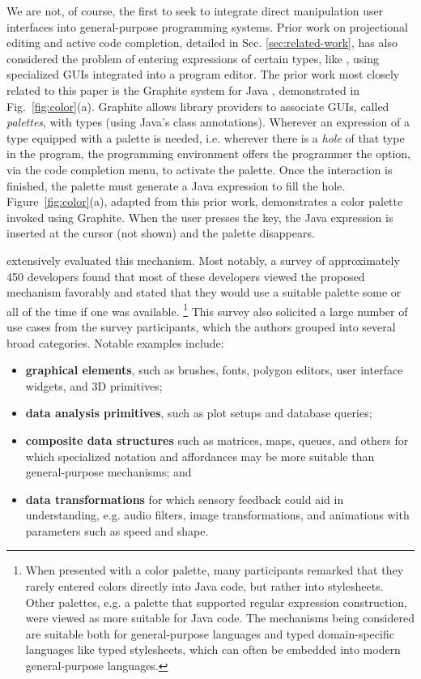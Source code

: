We are not, of course, the first to seek to integrate direct manipulation user interfaces
into general-purpose programming systems.
Prior work on projectional editing
and active code completion, detailed in Sec. \ref{sec:related-work},
has also considered the problem of entering expressions
of certain types, like ,
using specialized GUIs integrated into a program editor.
The prior work most closely related to this paper is the {Graphite} system for Java \cite{Graphite},
demonstrated in Fig.~\ref{fig:color}(a).
Graphite allows library providers to associate GUIs, called \emph{palettes}, with types (using Java's class annotations).
Wherever an expression of a type equipped with a palette is needed,
i.e. wherever there is a \emph{hole} of that type in the program,
the programming environment offers the programmer the option, via the code completion menu,
to activate the palette.
Once the interaction is finished, the palette must generate a
Java expression to fill the hole.
Figure~\ref{fig:color}(a), adapted from this prior work, demonstrates a color palette invoked using Graphite.
When the user presses the  key, the Java expression  is inserted at the cursor (not shown) and the palette disappears.

\citet{Graphite} extensively evaluated this mechanism.
Most notably, a survey of approximately 450 developers found that
most of these developers viewed the proposed mechanism favorably and stated that they
would use a suitable palette some or all of the time if one was available.%
\footnote{When presented with a color palette,
many participants remarked that they rarely entered colors directly into Java code,
but rather into stylesheets.
Other palettes, e.g. a palette
that supported regular expression construction, were viewed as more
suitable for Java code.
The mechanisms being considered are suitable both for general-purpose languages
and typed domain-specific languages like typed stylesheets, which can often be embedded into modern
general-purpose languages.}
This survey also solicited a large number of use cases from the survey participants,
which the authors grouped into several broad categories. Notable examples include:
\begin{itemize}
  \item \textbf{graphical elements}, such as brushes, fonts, polygon editors, user interface widgets, and 3D primitives;
  \item \textbf{data analysis primitives}, such as plot setups and database queries;
  \item \textbf{composite data structures} such as matrices, maps, queues, and others for which specialized notation and affordances may be more suitable than general-purpose mechanisms; and
  \item \textbf{data transformations} for which sensory feedback could aid in understanding,
  e.g. audio filters, image transformations, and animations with parameters such as speed and shape.
\end{itemize}

